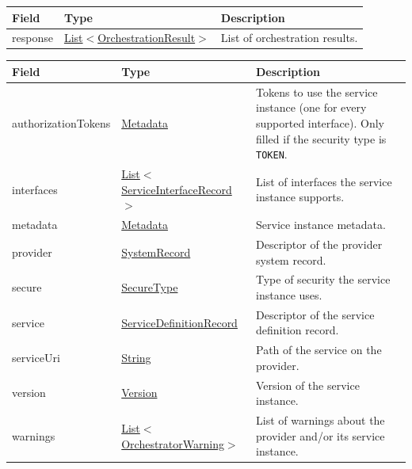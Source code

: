\documentclass[a4paper]{arrowhead}
\newcommand{\pref}[1]{{\textcolor{ArrowheadGrey}{\hyperref[sec:model:primitives:#1]{#1}}}}
\begin{document}
\label{sec:model:OrchestrationResultList}

\begin{table}[ht!]
\begin{tabularx}{\textwidth}{| p{3cm} | p{6cm} | X |} \hline
\rowcolor{gray!33} Field & Type & Description \\ \hline
response & \pref{List}$<$\hyperref[sec:model:OrchestrationResult]{OrchestrationResult}$>$ & List of orchestration results. \\ \hline
\end{tabularx}
\end{table}

\label{sec:model:OrchestrationResult}

\begin{table}[ht!]
\begin{tabularx}{\textwidth}{| p{4cm} | p{4.6cm} | X |} \hline
\rowcolor{gray!33} Field & Type & Description \\ \hline
authorizationTokens & \hyperref[sec:model:Metadata]{Metadata} & Tokens to use the service instance (one for every supported interface). Only filled if the security type is \texttt{TOKEN}. \\ \hline
interfaces & \pref{List}$<$\hyperref[sec:model:ServiceInterfaceRecord]{ServiceInterfaceRecord}$>$ & List of interfaces the service instance supports. \\ \hline
metadata & \hyperref[sec:model:Metadata]{Metadata} & Service instance metadata. \\ \hline
provider & \hyperref[sec:model:SystemRecord]{SystemRecord} & Descriptor of the provider system record. \\ \hline
secure & \pref{SecureType} & Type of security the service instance uses. \\ \hline
service & \hyperref[sec:model:ServiceDefinitionRecord]{ServiceDefinitionRecord} & Descriptor of the service definition record. \\ \hline
serviceUri & \pref{String} & Path of the service on the provider. \\ \hline
version & \pref{Version} & Version of the service instance. \\ \hline
warnings & \pref{List}$<$\pref{OrchestratorWarning}$>$ & List of warnings about the provider and/or its service instance. \\ \hline
\end{tabularx}
\end{table}
\end{document}

